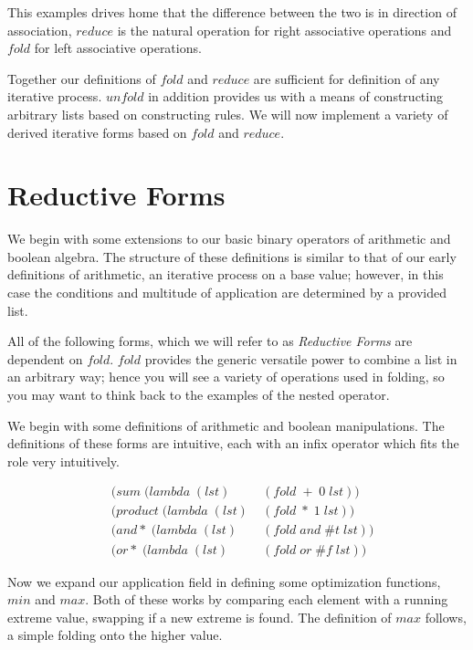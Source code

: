 This examples drives home that the difference between the two is in direction of 
association, $reduce$ is the natural operation for right associative operations 
and $fold$ for left associative operations.

Together our definitions of $fold$ and $reduce$ are sufficient for definition of 
any iterative process. $unfold$ in addition provides us with a means of 
constructing arbitrary lists based on constructing rules. We will now implement a 
variety of derived iterative forms based on $fold$ and $reduce$.

\section{Reductive Forms}
We begin with some extensions to our basic binary operators of arithmetic and 
boolean algebra. The structure of these definitions is similar to that of our 
early definitions of arithmetic, an iterative process on a base value; however, in 
this case the conditions and multitude of application are determined by a provided 
list.

All of the following forms, which we will refer to as \emph{Reductive Forms} are 
dependent on $fold$. $fold$ provides the generic versatile power to combine a list 
in an arbitrary way; hence you will see a variety of operations used in folding, 
so you may want to think back to the examples of the nested operator.

We begin with some definitions of arithmetic and boolean manipulations. The 
definitions of these forms are intuitive, each with an infix operator which fits 
the role very intuitively.

\begin{figure}[htp]
\footnotesize
\caption{}\label{fig:folders}
\begin{align*}
& (sum \; (lambda \; (lst) \; &(fold \; + \; 0 \; lst))
\\& (product \; (lambda \; (lst) \; &(fold \; * \; 1 \; lst))
\\& (and* \; (lambda \; (lst) \; &(fold \; and \; \#t \; lst))
\\& (or* \; (lambda \; (lst) \; &(fold \; or \; \#f \; lst))
\end{align*}
\end{figure}

Now we expand our application field in defining some optimization functions, $min$ 
and $max$. Both of these works by comparing each element with a running extreme 
value, swapping if a new extreme is found. The definition of $max$ follows, a 
simple folding onto the higher value.

